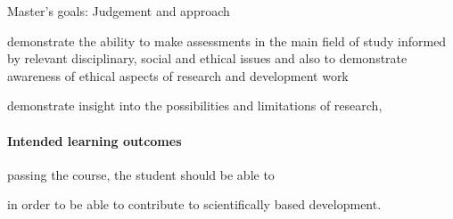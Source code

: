   \begin{block}{Master's goals: Judgement and approach~\autocite{HEO2}}
      \item\label{J1} demonstrate the ability to make assessments in the main 
        field of study informed by relevant disciplinary, social and ethical 
        issues and also to demonstrate awareness of ethical aspects of research 
        and development work
      \item\label{J2} demonstrate insight into the possibilities and 
        limitations of research, \textelp{}
  \end{block}

\paragraph{Intended learning outcomes}\label{LearningOutcomes}

\begin{frame}[fragile]
  passing the course, the student should be able to
    \item\LOrelate*
    \item\LOevaluate*
    \item\LOapply*
  in order to be able to contribute to scientifically based development.
\end{frame}

